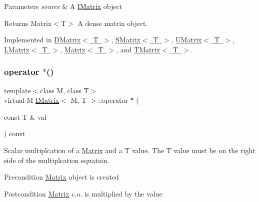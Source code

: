 \begin{DoxyParams}{Parameters}
{\em source} & A \mbox{\hyperlink{class_i_matrix}{I\+Matrix}} object \\
\hline
\end{DoxyParams}
\begin{DoxyReturn}{Returns}
Matrix$<$\+T$>$ A dense matrix object. 
\end{DoxyReturn}


Implemented in \mbox{\hyperlink{class_d_matrix_aef4468dd3919416a12fbde911b653a8e}{D\+Matrix$<$ T $>$}}, \mbox{\hyperlink{class_s_matrix_a7a59af4ecdf50b7d0cb901e0de127372}{S\+Matrix$<$ T $>$}}, \mbox{\hyperlink{class_u_matrix_a55729b6ed8ac7ce6c2ac7baa21c1ea26}{U\+Matrix$<$ T $>$}}, \mbox{\hyperlink{class_l_matrix_a09f9f4cc80fda1508e71aaf72f1366ad}{L\+Matrix$<$ T $>$}}, \mbox{\hyperlink{class_matrix_a48fc463a410f5d2b0381830d78229c2c}{Matrix$<$ T $>$}}, and \mbox{\hyperlink{class_t_matrix_aeabaac0c1812fabb7fbae685a475cd8e}{T\+Matrix$<$ T $>$}}.

\mbox{\label{class_i_matrix_a10121e038635bdf33552c6a1fb288398}} 
\subsubsection{\texorpdfstring{operator $\ast$()}{operator *()}}
{\footnotesize\ttfamily template$<$class M, class T$>$ \\
virtual M \mbox{\hyperlink{class_i_matrix}{I\+Matrix}}$<$ M, T $>$\+::operator $\ast$ (\begin{DoxyParamCaption}\item[{const T \&}]{val }\end{DoxyParamCaption}) const\hspace{0.3cm}{\ttfamily [pure virtual]}}



Scalar multiplcation of a \mbox{\hyperlink{class_matrix}{Matrix}} and a T value. The T value must be on the right side of the multiplcation equation. 

\begin{DoxyPrecond}{Precondition}
\mbox{\hyperlink{class_matrix}{Matrix}} object is created 
\end{DoxyPrecond}
\begin{DoxyPostcond}{Postcondition}
\mbox{\hyperlink{class_matrix}{Matrix}} c.\+o. is multiplied by the value 
\end{DoxyPostcond}

